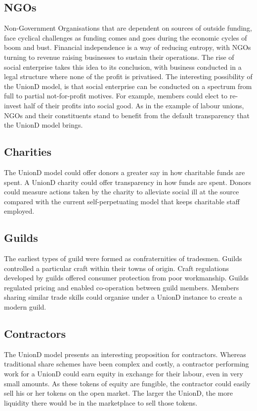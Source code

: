 \documentclass[12pt,twocolumn]{article}
\begin{document}
\subsection{NGOs}

Non-Government Organisations that are dependent on sources of outside funding, face cyclical challenges as funding comes and goes during the economic cycles of boom and bust. Financial independence is a way of reducing entropy, with NGOs turning to revenue raising businesses to sustain their operations. The rise of social enterprise takes this idea to its conclusion, with business conducted in a legal structure where none of the profit is privatised. The interesting possibility of the UnionD model, is that social enterprise can be conducted on a spectrum from full to partial not-for-profit motives. For example, members could elect to re-invest half of their profits into social good. As in the example of labour unions, NGOs and their constituents stand to benefit from the default transparency that the UnionD model brings.

\subsection{Charities}

The UnionD model could offer donors a greater say in how charitable funds are spent. A UnionD charity could offer transparency in how funds are spent. Donors could measure actions taken by the charity to alleviate social ill at the source compared with the current self-perpetuating model that keeps charitable staff employed.

\subsection{Guilds}

The earliest types of guild were formed as confraternities of tradesmen. Guilds controlled a particular craft within their towns of origin. Craft regulations developed by guilds offered consumer protection from poor workmanship. Guilds regulated pricing and enabled co-operation between guild members. Members sharing similar trade skills could organise under a UnionD instance to create a modern guild.

\subsection{Contractors}

The UnionD model presents an interesting proposition for contractors. Whereas traditional share schemes have been complex and costly, a contractor performing work for a UnionD could earn equity in exchange for their labour, even in very small amounts. As these tokens of equity are fungible, the contractor could easily sell his or her tokens on the open market. The larger the UnionD, the more liquidity there would be in the marketplace to sell those tokens.
\end{document}

